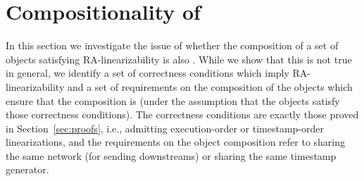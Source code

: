 
\section{Compositionality of \CRDTLin{}}
\label{sec:compositionality}




In this section we investigate the issue of whether the composition of a set of objects satisfying RA-linearizability is also \crdtlinearizable{}. While we show that this is not true in general, we identify a set of correctness conditions which imply RA-linearizability and a set of requirements on the composition of the objects which ensure that the composition is \crdtlinearizable{} (under the assumption that the objects satisfy those correctness conditions). The correctness conditions are exactly those proved in Section~\ref{sec:proofs}, i.e., admitting execution-order or timestamp-order linearizations, and the requirements on the object composition refer to sharing the same network (for sending downstreams) or sharing the same timestamp generator.

